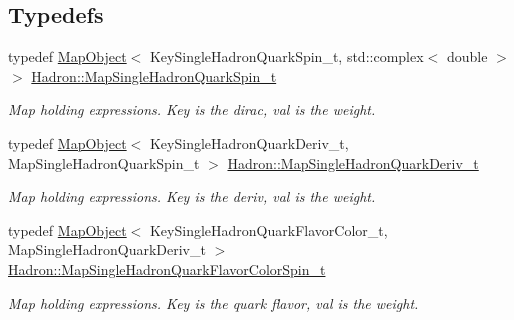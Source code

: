 \subsection*{Typedefs}
\begin{DoxyCompactItemize}
\item 
typedef \mbox{\hyperlink{classADAT_1_1MapObject}{Map\+Object}}$<$ Key\+Single\+Hadron\+Quark\+Spin\+\_\+t, std\+::complex$<$ double $>$ $>$ \mbox{\hyperlink{namespaceHadron_a22279e56b59508dc8dd2c8991dc911fd}{Hadron\+::\+Map\+Single\+Hadron\+Quark\+Spin\+\_\+t}}
\begin{DoxyCompactList}\small\item\em Map holding expressions. Key is the dirac, val is the weight. \end{DoxyCompactList}\item 
typedef \mbox{\hyperlink{classADAT_1_1MapObject}{Map\+Object}}$<$ Key\+Single\+Hadron\+Quark\+Deriv\+\_\+t, Map\+Single\+Hadron\+Quark\+Spin\+\_\+t $>$ \mbox{\hyperlink{namespaceHadron_aa588220689caea8a6aad4d0296526e6b}{Hadron\+::\+Map\+Single\+Hadron\+Quark\+Deriv\+\_\+t}}
\begin{DoxyCompactList}\small\item\em Map holding expressions. Key is the deriv, val is the weight. \end{DoxyCompactList}\item 
typedef \mbox{\hyperlink{classADAT_1_1MapObject}{Map\+Object}}$<$ Key\+Single\+Hadron\+Quark\+Flavor\+Color\+\_\+t, Map\+Single\+Hadron\+Quark\+Deriv\+\_\+t $>$ \mbox{\hyperlink{namespaceHadron_a03b319764f85c20434f20a269ce5f388}{Hadron\+::\+Map\+Single\+Hadron\+Quark\+Flavor\+Color\+Spin\+\_\+t}}
\begin{DoxyCompactList}\small\item\em Map holding expressions. Key is the quark flavor, val is the weight. \end{DoxyCompactList}\end{DoxyCompactItemize}
